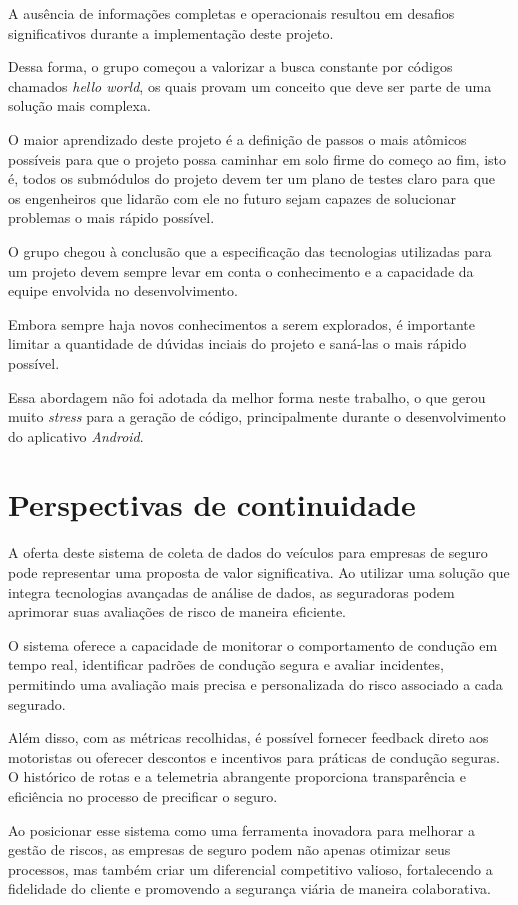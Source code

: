     A ausência de informações completas e operacionais resultou em desafios significativos durante a implementação deste projeto.
    
    Dessa forma, o grupo começou a valorizar a busca constante por códigos chamados \textit{hello world}, os quais provam um conceito que deve ser parte de uma solução mais complexa.
    
    O maior aprendizado deste projeto é a definição de passos o mais atômicos possíveis para que o projeto possa caminhar em solo firme do começo ao fim, isto é, todos os submódulos do projeto devem ter um plano de testes claro para que os engenheiros que lidarão com ele no futuro sejam capazes de solucionar problemas o mais rápido possível.

    O grupo chegou à conclusão que a especificação das tecnologias utilizadas para um projeto devem sempre levar em conta o conhecimento e a capacidade da equipe envolvida no desenvolvimento.

    Embora sempre haja novos conhecimentos a serem explorados, é importante limitar a quantidade de dúvidas inciais do projeto e saná-las o mais rápido possível.

    Essa abordagem não foi adotada da melhor forma neste trabalho, o que gerou muito \textit{stress} para a geração de código, principalmente durante o desenvolvimento do aplicativo \textit{Android}.

\section{Perspectivas de continuidade}
A oferta deste sistema de coleta de dados do veículos para empresas de seguro pode representar uma proposta de valor significativa. Ao utilizar uma solução que integra tecnologias avançadas de análise de dados, as seguradoras podem aprimorar suas avaliações de risco de maneira eficiente. 

O sistema oferece a capacidade de monitorar o comportamento de condução em tempo real, identificar padrões de condução segura e avaliar incidentes, permitindo uma avaliação mais precisa e personalizada do risco associado a cada segurado. 

Além disso, com as métricas recolhidas, é possível fornecer feedback direto aos motoristas ou oferecer descontos e incentivos para práticas de condução seguras. O histórico de rotas e a telemetria abrangente proporciona transparência e eficiência no processo de precificar o seguro. 

Ao posicionar esse sistema como uma ferramenta inovadora para melhorar a gestão de riscos, as empresas de seguro podem não apenas otimizar seus processos, mas também criar um diferencial competitivo valioso, fortalecendo a fidelidade do cliente e promovendo a segurança viária de maneira colaborativa.